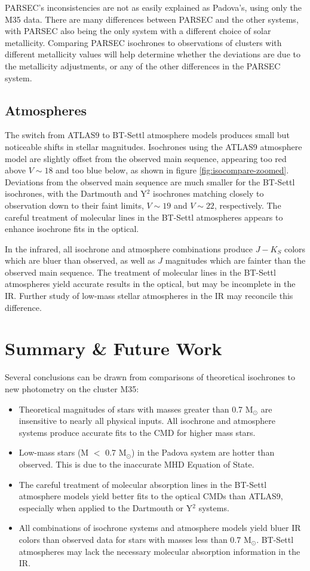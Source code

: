\documentclass[iop]{emulateapj}
\begin{document}
PARSEC's inconsistencies are not as easily explained as Padova's, using only the M35 data. There are many differences between PARSEC and the other systems, with PARSEC also being the only system with a different choice of solar metallicity. Comparing PARSEC isochrones to observations of clusters with different metallicity values will help determine whether the deviations are due to the metallicity adjustments, or any of the other differences in the PARSEC system.


\subsection{Atmospheres}
The switch from ATLAS9 to BT-Settl atmosphere models produces small but noticeable shifts in stellar magnitudes. Isochrones using the ATLAS9 atmosphere model are slightly offset from the observed main sequence, appearing too red above $V \sim 18$ and too blue below, as shown in figure \ref{fig:isocompare-zoomed}. Deviations from the observed main sequence are much smaller for the BT-Settl isochrones, with the Dartmouth and Y$^2$ isochrones matching closely to observation down to their faint limits, $V \sim 19$ and $V \sim 22$, respectively. The careful treatment of molecular lines in the BT-Settl atmospheres appears to enhance isochrone fits in the optical.

In the infrared, all isochrone and atmosphere combinations produce $J-K_S$ colors which are bluer than observed, as well as $J$ magnitudes which are fainter than the observed main sequence.  The treatment of molecular lines in the BT-Settl atmospheres yield accurate results in the optical, but may be incomplete in the IR. Further study of low-mass stellar atmospheres in the IR may reconcile this difference.



\section{Summary \& Future Work}

Several conclusions can be drawn from comparisons of theoretical isochrones to new photometry on the cluster M35:

\begin{itemize}
\item Theoretical magnitudes of stars with masses greater than 0.7 M$_\odot$ are insensitive to nearly all physical inputs. All isochrone and atmosphere systems produce accurate fits to the CMD for higher mass stars.
\item Low-mass stars (M $<$ 0.7 M$_\odot$) in the Padova system are hotter than observed. This is due to the inaccurate MHD Equation of State.
\item The careful treatment of molecular absorption lines in the BT-Settl atmosphere models yield better fits to the optical CMDs than ATLAS9, especially when applied to the Dartmouth or Y$^2$ systems.
\item All combinations of isochrone systems and atmosphere models yield bluer IR colors than observed data for stars with masses less than 0.7 M$_\odot$. BT-Settl atmospheres may lack the necessary molecular absorption information in the IR.
\end{itemize}
\end{document}
